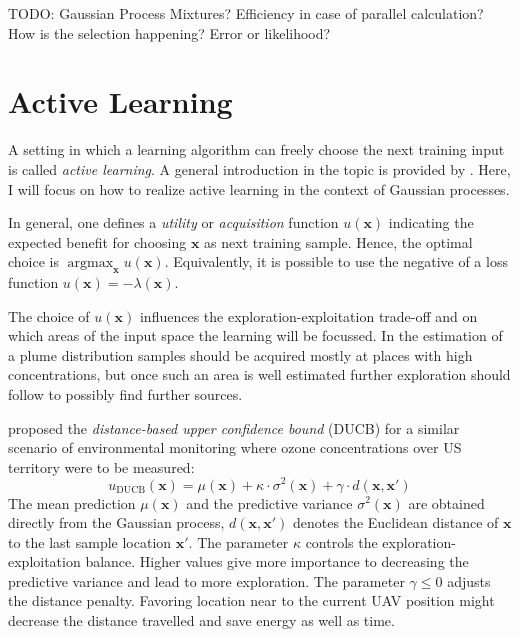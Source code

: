 \documentclass[11pt,a4paper]{scrreprt}
\newcommand{\vc}[1]{\bm{#1}}
\DeclareMathOperator*{\argmax}{argmax}
\newcommand{\newterm}[1]{\emph{#1}}
\begin{document}
TODO: Gaussian Process Mixtures? Efficiency in case of parallel calculation?
How is the selection happening? Error or likelihood?

\section{Active Learning}
A setting in which a learning algorithm can freely choose the next training 
input is called \newterm{active learning}. A general introduction in the topic 
is provided by \textcite{Settles:2009vo}. Here, I will focus on how to realize 
active learning in the context of Gaussian processes.

In general, one defines a \newterm{utility} or \newterm{acquisition} function 
$u(\vc x)$ indicating the expected benefit for choosing $\vc x$ as next training 
sample. Hence, the optimal choice is $\argmax_{\vc x} u(\vc x)$. Equivalently, 
it is possible to use the negative of a loss function $u(\vc x) = - \lambda(\vc 
x)$.

The choice of $u(\vc x)$ influences the exploration-exploitation trade-off and 
on which areas of the input space the learning will be focussed. In the 
estimation of a plume distribution samples should be acquired mostly at places 
with high concentrations, but once such an area is well estimated further 
exploration should follow to possibly find further sources.

\Textcite{Marchant:2012wb} proposed the \newterm{distance-based upper confidence 
    bound} (DUCB) for a similar scenario of environmental monitoring where ozone 
concentrations over US territory were to be measured:
\begin{equation}
    u_{\text{DUCB}}(\vc x) = \mu(\vc x) + \kappa \cdot \sigma^2(\vc x) + \gamma 
    \cdot d(\vc x, \vc x')
\end{equation}
The mean prediction $\mu(\vc x)$ and the predictive variance $\sigma^2(\vc x)$ 
are obtained directly from the Gaussian process, $d(\vc x, \vc x')$ denotes the 
Euclidean distance of $\vc x$ to the last sample location $\vc x'$. The 
parameter $\kappa$ controls the exploration-exploitation balance. Higher values 
give more importance to decreasing the predictive variance and lead to more 
exploration. The parameter $\gamma \leq 0$ adjusts the distance penalty.  
Favoring location near to the current UAV position might decrease the distance 
travelled and save energy as well as time.
\end{document}
